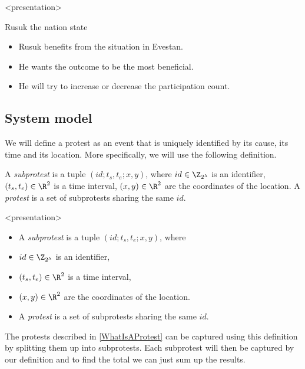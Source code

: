 \begin{frame}<presentation>
  \begin{block}{Rusuk the nation state}
    \begin{itemize}
      \item Rusuk benefits from the situation in Evestan.
      \item He wants the outcome to be the most beneficial.
      \item He will try to increase or decrease the participation count.
    \end{itemize}
  \end{block}
\end{frame}

\subsection{System model}

We will define a protest as an event that is uniquely identified by its cause, 
its time and its location.
More specifically, we will use the following definition.

\begin{definition}[Protest]\label{DefProtest}
  A \emph{subprotest} is a tuple \((id; t_s, t_e; x, y)\), where
  \(id\in \Z_{2^\lambda}\) is an identifier,
  \((t_s, t_e)\in \R^2\) is a time interval,
  \((x, y)\in \R^2\) are the coordinates of the location.
  A \emph{protest} is a set of subprotests sharing the same \(id\).
\end{definition}

\begin{frame}<presentation>
\begin{definition}[Protest]
  \begin{itemize}
    \item A \emph{subprotest} is a tuple \((id; t_s, t_e; x, y)\), where
    \item \(id\in \Z_{2^\lambda}\) is an identifier,
    \item \((t_s, t_e)\in \R^2\) is a time interval,
    \item \((x, y)\in \R^2\) are the coordinates of the location.
    \item A \emph{protest} is a set of subprotests sharing the same \(id\).
  \end{itemize}
\end{definition}
\end{frame}

The protests described in \cref{WhatIsAProtest} can be captured using this 
definition by splitting them up into subprotests.
Each subprotest will then be captured by our definition and to find the total 
we can just sum up the results.

